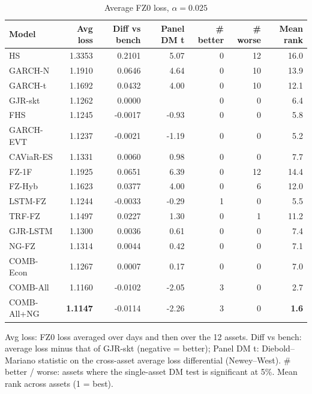 \begin{table}[htbp]
\centering
\footnotesize
\caption{Average FZ0 loss, $\alpha=0.025$}
\label{tab:loss_a025}
\begin{tabular}{lrrrrrr}
\toprule
Model & Avg loss & Diff vs bench & Panel DM t & \# better & \# worse & Mean rank \\
\midrule
HS & 1.3353 & 0.2101 & 5.07 & 0 & 12 & 16.0 \\
GARCH-N & 1.1910 & 0.0646 & 4.64 & 0 & 10 & 13.9 \\
GARCH-t & 1.1692 & 0.0432 & 4.00 & 0 & 10 & 12.1 \\
GJR-skt & 1.1262 & 0.0000 &  & 0 & 0 & 6.4 \\
FHS & 1.1245 & -0.0017 & -0.93 & 0 & 0 & 5.8 \\
GARCH-EVT & 1.1237 & -0.0021 & -1.19 & 0 & 0 & 5.2 \\
CAViaR-ES & 1.1331 & 0.0060 & 0.98 & 0 & 0 & 7.7 \\
FZ-1F & 1.1925 & 0.0651 & 6.39 & 0 & 12 & 14.4 \\
FZ-Hyb & 1.1623 & 0.0377 & 4.00 & 0 & 6 & 12.0 \\
LSTM-FZ & 1.1244 & -0.0033 & -0.29 & 1 & 0 & 5.5 \\
TRF-FZ & 1.1497 & 0.0227 & 1.30 & 0 & 1 & 11.2 \\
GJR-LSTM & 1.1300 & 0.0036 & 0.61 & 0 & 0 & 7.4 \\
NG-FZ & 1.1314 & 0.0044 & 0.42 & 0 & 0 & 7.1 \\
COMB-Econ & 1.1267 & 0.0007 & 0.17 & 0 & 0 & 7.0 \\
COMB-All & 1.1160 & -0.0102 & -2.05 & 3 & 0 & 2.7 \\
COMB-All+NG & \textbf{1.1147} & -0.0114 & -2.26 & 3 & 0 & \textbf{1.6} \\
\bottomrule
\end{tabular}
\par\smallskip\parbox{\linewidth}{\scriptsize Avg loss: FZ0 loss averaged over days and then over the 12 assets. Diff vs bench: average loss minus that of GJR-skt (negative = better); Panel DM t: Diebold--Mariano statistic on the cross-asset average loss differential (Newey--West). \# better / worse: assets where the single-asset DM test is significant at 5\%. Mean rank across assets (1 = best).}
\end{table}